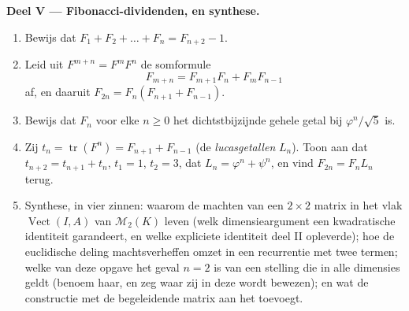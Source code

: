 \begin{problem}
\medskip
\noindent\textbf{Deel V --- Fibonacci-dividenden, en synthese.}
\begin{enumerate}[resume]
  \item Bewijs dat $F_1 + F_2 + \dots + F_n = F_{n+2} - 1$.
  \item Leid uit $F^{m+n} = F^m F^n$ de somformule
        \[
        F_{m+n} = F_{m+1}F_n + F_m F_{n-1}
        \]
        af, en daaruit $F_{2n} = F_n(F_{n+1} + F_{n-1})$.
  \item Bewijs dat $F_n$ voor elke $n \geq 0$ het dichtstbijzijnde
        gehele getal bij $\varphi^n/\sqrt5$ is.
  \item Zij $t_n = \operatorname{tr}(F^n) = F_{n+1} + F_{n-1}$ (de
        \emph{lucasgetallen} $L_n$). Toon aan dat $t_{n+2} = t_{n+1}
        + t_n$, $t_1 = 1$, $t_2 = 3$, dat $L_n = \varphi^n +
        \psi^n$, en vind $F_{2n} = F_n L_n$ terug.
  \item Synthese, in vier zinnen: waarom de machten van een $2
        \times 2$ matrix in het vlak $\operatorname{Vect}(I, A)$
        van $\mathcal{M}_2(K)$ leven (welk dimensieargument een
        kwadratische identiteit garandeert, en welke expliciete
        identiteit deel II opleverde); hoe de euclidische deling
        machtsverheffen omzet in een recurrentie met twee termen;
        welke  van deze opgave het geval $n = 2$ is van
        een stelling die in alle dimensies geldt (benoem haar, en
        zeg waar zij in deze  wordt bewezen); en wat de
        constructie met de begeleidende matrix aan het 
        toevoegt.
\end{enumerate}
\end{problem}
